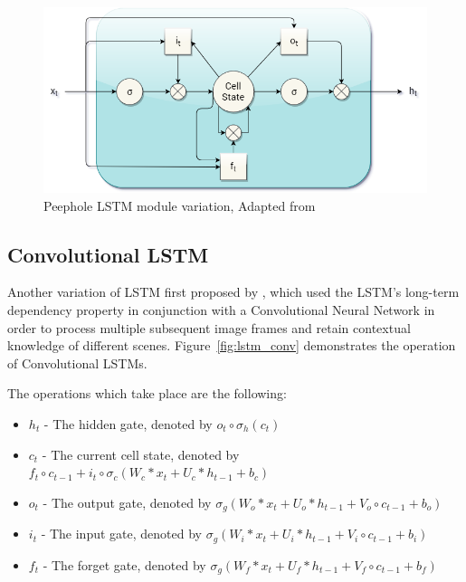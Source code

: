 \begin{figure}
	\centering
	\includegraphics[width=0.6\linewidth]{graphics/lstm/lstm_peephole.png}
	\caption{
		Peephole LSTM module variation, Adapted from \citet{6638947}
	}
	\label{fig:lstm_peephole}
\end{figure}

\subsection{Convolutional LSTM}
Another variation of LSTM first proposed by \citet{Shi:2015:CLN:2969239.2969329}, which used the LSTM's long-term dependency property in conjunction with a Convolutional Neural Network in order to process multiple subsequent image frames and retain contextual knowledge of different scenes. Figure~\ref{fig:lstm_conv} demonstrates the operation of Convolutional LSTMs.

\pagebreak[1]

The operations which take place are the following:

\begin{itemize}
	\setlength{\itemsep}{1pt}
	\setlength{\parskip}{0pt}
	\setlength{\parsep}{0pt}
	\item {$h_{t}$} - The hidden gate, denoted by {$o_{t} \circ \sigma_{h}(c_{t})$}
	\item {$c_{t}$} - The current cell state, denoted by {$f_{t} \circ c_{t-1} + i_{t} \circ \sigma_{c}(W_{c} {\displaystyle *} x_{t} + U_{c} {\displaystyle *} h_{t-1} + b_{c})$}
	\item {$o_{t}$} - The output gate, denoted by {$\sigma_{g}(W_{o} {\displaystyle *} x_{t} + U_{o} {\displaystyle *} h_{t-1} + V_{o} \circ c_{t-1}+ b_{o})$}
	\item {$i_{t}$} - The input gate, denoted by {$\sigma_{g}(W_{i} {\displaystyle *} x_{t} + U_{i} {\displaystyle *} h_{t-1} + V_{i} \circ c_{t-1}+ b_{i})$}
	\item {$f_{t}$} - The forget gate, denoted by {$\sigma_{g}(W_{f} {\displaystyle *} x_{t} + U_{f} {\displaystyle *} h_{t-1} + V_{f} \circ c_{t-1}+ b_{f})$}
\end{itemize}

